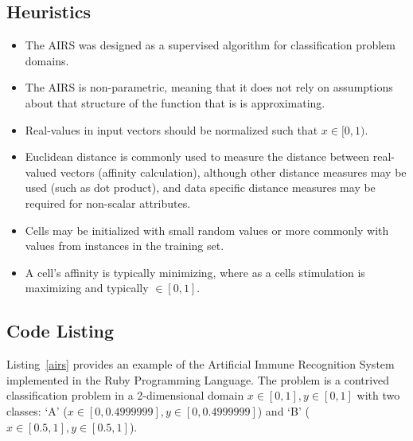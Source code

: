 \subsection{Heuristics}
\begin{itemize}
	\item The AIRS was designed as a supervised algorithm for classification problem domains.
	\item The AIRS is non-parametric, meaning that it does not rely on assumptions about that structure of the function that is is approximating.
	\item Real-values in input vectors should be normalized such that $x \in [0,1)$. 
	\item Euclidean distance is commonly used to measure the distance between real-valued vectors (affinity calculation), although other distance measures may be used (such as dot product), and data specific distance measures may be required for non-scalar attributes.
	\item Cells may be initialized with small random values or more commonly with values from instances in the training set.
	\item A cell's affinity is typically minimizing, where as a cells stimulation is maximizing and typically $\in [0,1]$.
\end{itemize}

\subsection{Code Listing}
Listing~\ref{airs} provides an example of the Artificial Immune Recognition System implemented in the Ruby Programming Language. 
The problem is a contrived classification problem in a 2-dimensional domain $x\in[0,1], y\in[0,1]$ with two classes: `A' ($x\in[0,0.4999999], y\in[0,0.4999999]$) and `B' ($x\in[0.5,1], y\in[0.5,1]$).

